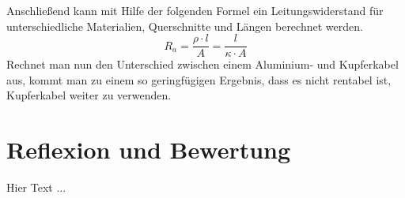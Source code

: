 Anschließend kann mit Hilfe der folgenden Formel ein Leitungswiderstand für unterschiedliche Materialien, Querschnitte und Längen berechnet werden.
\begin{equation}
R_a=\frac{\rho \cdot l}{A}=\frac{l}{\kappa \cdot A}
\label{eqn:Leitungswiderstand}
\end{equation}
Rechnet man nun den Unterschied zwischen einem Aluminium- und Kupferkabel aus, kommt man zu einem so geringfügigen Ergebnis, dass es nicht rentabel ist, 
Kupferkabel weiter zu verwenden.


\section{Reflexion und Bewertung}

Hier Text ...

\clearpage
